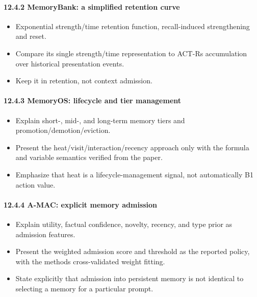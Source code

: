 \paragraph{12.4.2 MemoryBank: a simplified retention curve}\label{1242-memorybank-a-simplified-retention-curve}

\begin{itemize}
\tightlist
\item
  Exponential strength/time retention function, recall-induced strengthening and reset.
\item
  Compare its single strength/time representation to ACT-R\textquotesingle s accumulation over historical presentation events.
\item
  Keep it in retention, not context admission.
\end{itemize}

\paragraph{12.4.3 MemoryOS: lifecycle and tier management}\label{1243-memoryos-lifecycle-and-tier-management}

\begin{itemize}
\tightlist
\item
  Explain short-, mid-, and long-term memory tiers and promotion/demotion/eviction.
\item
  Present the heat/visit/interaction/recency approach only with the formula and variable semantics verified from the paper.
\item
  Emphasize that heat is a lifecycle-management signal, not automatically B1 action value.
\end{itemize}

\paragraph{12.4.4 A-MAC: explicit memory admission}\label{1244-a-mac-explicit-memory-admission}

\begin{itemize}
\tightlist
\item
  Explain utility, factual confidence, novelty, recency, and type prior as admission features.
\item
  Present the weighted admission score and threshold as the reported policy, with the method\textquotesingle s cross-validated weight fitting.
\item
  State explicitly that admission into persistent memory is not identical to selecting a memory for a particular prompt.
\end{itemize}

